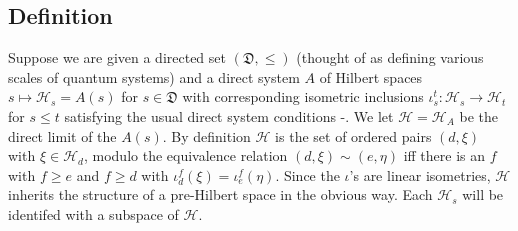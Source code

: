 \documentclass[11pt]{amsart}
\newcommand{\1}{\mathcal I}
\newcommand{\5}{\vskip 5pt}
\begin{document}
 \subsection{Definition}
 Suppose we are given a directed set $(\mathfrak D, \leq)$ (thought of as defining various scales of quantum systems)
 and a direct system $A$ of Hilbert spaces $s\mapsto \mathcal H_s=A(s)$ for $s\in \mathfrak D$ with corresponding isometric
 inclusions $\iota_s^t:\mathcal H_s \rightarrow \mathcal H_t $ for $s\leq t$ satisfying the usual direct system conditions -\cite{jonogo}.
 We let $\mathcal H=\mathcal H_A$ be the direct limit of the $A(s)$. By definition $\mathcal H$ is the set of ordered pairs
 $(d, \xi)$ with $\xi\in \mathcal H_d$, modulo the equivalence relation $(d,\xi)\sim(e,\eta)$ iff there is an $f$ with $f\geq e$ and
 $f\geq d$ with $\iota_d^f(\xi)=\iota_e^f(\eta)$. Since the $\iota$'s are linear isometries, $\mathcal H$ inherits the structure of
 a pre-Hilbert space in the obvious way. Each $\mathcal H_s$ will be identifed with a subspace of $\mathcal H$.
 
\end{document}

